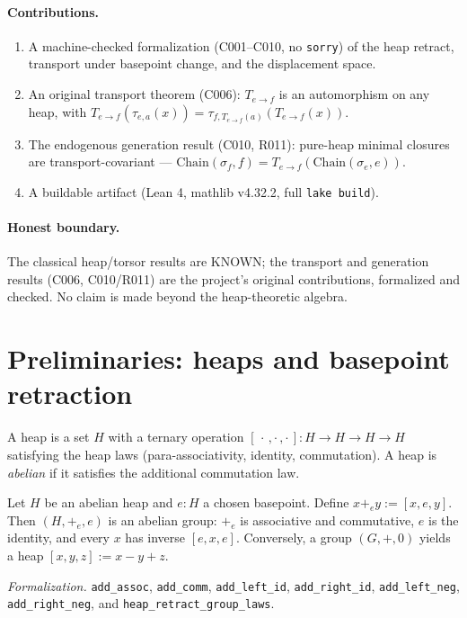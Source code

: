 \documentclass[sigplan,10pt,anonymous,review]{acmart}
\theoremstyle{remark}
\begin{document}
\paragraph{Contributions.}
\begin{enumerate}
\item A machine-checked formalization (C001--C010, no \texttt{sorry}) of the heap
retract, transport under basepoint change, and the displacement space.
\item An original transport theorem (C006): $T_{e \to f}$ is an automorphism on any
heap, with $T_{e \to f}(\tau_{e,a}(x)) = \tau_{f, T_{e \to f}(a)}(T_{e \to f}(x))$.
\item The endogenous generation result (C010, R011): pure-heap minimal closures are
transport-covariant --- $\mathrm{Chain}(\sigma_f, f) = T_{e \to f}(\mathrm{Chain}(\sigma_e, e))$.
\item A buildable artifact (Lean 4, mathlib v4.32.2, full \texttt{lake build}).
\end{enumerate}

\paragraph{Honest boundary.} The classical heap/torsor results are KNOWN; the
transport and generation results (C006, C010/R011) are the project's original
contributions, formalized and checked. No claim is made beyond the heap-theoretic
algebra.

\section{Preliminaries: heaps and basepoint retraction}

\begin{definition}[heap]\label{def:heap}
A heap is a set $H$ with a ternary operation $[\,\cdot\,,\cdot\,,\cdot\,] : H \to H \to H \to H$
satisfying the heap laws (para-associativity, identity, commutation). A heap is
\textit{abelian} if it satisfies the additional commutation law.
\end{definition}

\begin{theorem}\label{thm:retract}
Let $H$ be an abelian heap and $e : H$ a chosen basepoint. Define
$x +_e y := [x, e, y]$. Then $(H, +_e, e)$ is an abelian group: $+_e$ is associative
and commutative, $e$ is the identity, and every $x$ has inverse $[e, x, e]$.
Conversely, a group $(G, +, 0)$ yields a heap $[x, y, z] := x - y + z$.
\end{theorem}
\emph{Formalization.} \texttt{add\_assoc}, \texttt{add\_comm}, \texttt{add\_left\_id},
\texttt{add\_right\_id}, \texttt{add\_left\_neg}, \texttt{add\_right\_neg}, and
\texttt{heap\_retract\_group\_laws}.
\end{document}
